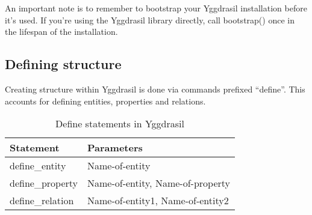 \documentclass[english,a4paper]{article}
\begin{document}
An important note is to remember to bootstrap your Yggdrasil
installation before it's used.  If you're using the Yggdrasil library
directly, call bootstrap() once in the lifespan of the installation.

\subsection{Defining structure}

Creating structure within Yggdrasil is done via commands prefixed
``define''.  This accounts for defining entities, properties and
relations.  

\begin{table}[h]
\centering
\caption{Define statements in Yggdrasil}

\begin{tabular}{l l}
\hline\hline %
Statement & Parameters \\
\hline
define\_entity  & Name-of-entity \\
define\_property & Name-of-entity, Name-of-property \\
define\_relation & Name-of-entity1, Name-of-entity2 \\
\end{tabular}

\end{table}
\end{document}
